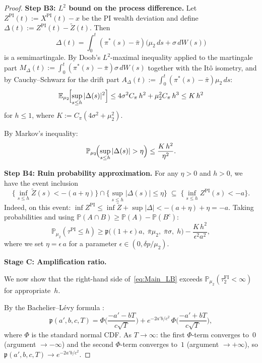 \documentclass[12pt]{article}
\theoremstyle{remark}
\theoremstyle{definition}
\newcommand{\E}{\mathbb{E}}
\newcommand{\Prob}{\mathbb{P}}
\newcommand{\FI}{\mathrm{FI}}
\newcommand{\PI}{\mathrm{PI}}
\begin{document}
\begin{proof}
\medskip\noindent\textbf{Step B3: $L^2$ bound on the process difference.}
Let $Z^{\PI}(t) := X^{\PI}(t) - x$ be the PI wealth deviation and define
$\Delta(t) := Z^{\PI}(t) - \widetilde{Z}(t)$.
Then
\[
  \Delta(t) = \int_0^t (\pi^*(s) - \bar{\pi})
  \bigl(\mu_2\,ds + \sigma\,dW(s)\bigr)
\]
is a semimartingale.
By Doob's $L^2$-maximal inequality applied to the martingale part
$M_\Delta(t) := \int_0^t (\pi^*(s) - \bar{\pi})\sigma\,dW(s)$
together with the It\^o isometry, and by Cauchy--Schwarz for the drift part
$A_\Delta(t) := \int_0^t (\pi^*(s) - \bar{\pi})\mu_2\,ds$:
\begin{equation}\label{eq:Delta_L2}
  \E_{\mu_2}\!\Bigl[\sup_{s \le h}|\Delta(s)|^2\Bigr]
  \le 4\sigma^2 C_\pi\,h^2 + \mu_2^2 C_\pi\,h^3
  \le K\,h^2
\end{equation}
for $h \le 1$, where $K := C_\pi(4\sigma^2 + \mu_2^2)$.

By Markov's inequality:
\begin{equation}\label{eq:Delta_Markov}
  \Prob_{\mu_2}\!\Bigl(\sup_{s \le h}|\Delta(s)| > \eta\Bigr)
  \le \frac{K\,h^2}{\eta^2}.
\end{equation}

\medskip\noindent\textbf{Step B4: Ruin probability approximation.}
For any $\eta > 0$ and $h > 0$, we have the event inclusion
\[
  \bigl\{\inf_{s \le h}\widetilde{Z}(s) < -(a+\eta)\bigr\}
  \cap \bigl\{\sup_{s \le h}|\Delta(s)| \le \eta\bigr\}
  \;\subseteq\;
  \bigl\{\inf_{s \le h} Z^{\PI}(s) < -a\bigr\}.
\]
Indeed, on this event: $\inf Z^{\PI} \le \inf\widetilde{Z} + \sup|\Delta|
< -(a+\eta) + \eta = -a$.
Taking probabilities and using $\Prob(A \cap B) \ge \Prob(A) - \Prob(B^c)$:
\begin{equation}\label{eq:Main_LB}
  \Prob_{\mu_2}(\tau^{\PI} \le h)
  \ge \mathfrak{p}\!\bigl((1+\epsilon)a,\;\bar{\pi}\mu_2,\;
      \bar{\pi}\sigma,\;h\bigr)
  - \frac{K\,h^2}{\epsilon^2 a^2},
\end{equation}
where we set $\eta = \epsilon\,a$ for a parameter
$\epsilon \in (0, \delta p/\mu_2)$.

\medskip
\textbf{Stage C: Amplification ratio.}

We now show that the right-hand side of~\eqref{eq:Main_LB} exceeds
$\Prob_{\mu_2}(\tau_2^{\FI} < \infty)$ for appropriate~$h$.

By the Bachelier--L\'evy formula
\citep[Proposition~3.5.2]{KaratzasShreve1991}:
\begin{equation}\label{eq:BL_formula}
  \mathfrak{p}(a', b, c, T)
  = \Phi\!\biggl(\frac{-a'-bT}{c\sqrt{T}}\biggr)
  + e^{-2a'b/c^2}\,\Phi\!\biggl(\frac{-a'+bT}{c\sqrt{T}}\biggr),
\end{equation}
where $\Phi$ is the standard normal CDF.
As $T \to \infty$: the first $\Phi$-term converges to~$0$ (argument $\to -\infty$)
and the second $\Phi$-term converges to~$1$ (argument $\to +\infty$),
so $\mathfrak{p}(a', b, c, T) \to e^{-2a'b/c^2}$.


\end{proof}
\end{document}
